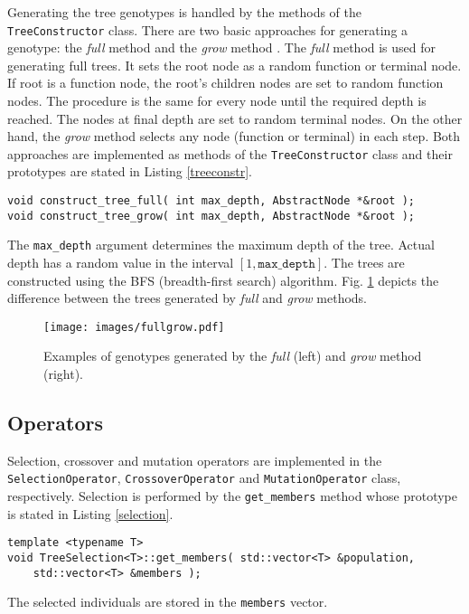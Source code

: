 Generating the tree genotypes is handled by the methods of the \texttt{TreeConstructor} class.
There are two basic approaches for generating a genotype: the \textit{full} method and the \textit{grow} method \cite{koza1992genetic}.
The \textit{full} method is used for generating full trees. 
It sets the root node as a random function or terminal node.
If root is a function node, the root's children nodes are set to random function nodes.
The procedure is the same for every node until the required depth is reached.
The nodes at final depth are set to random terminal nodes.
On the other hand, the \textit{grow} method selects any node (function or terminal) in each step.
Both approaches are implemented as methods of the \texttt{TreeConstructor} class and their prototypes are stated in Listing \ref{treeconstr}.
\begin{lstlisting}[frame=none, label={treeconstr}, caption={Functions for implementing the \textit{full} and \textit{grow} methods for creating a genotype.}, captionpos=b]
void construct_tree_full( int max_depth, AbstractNode *&root );
void construct_tree_grow( int max_depth, AbstractNode *&root );
\end{lstlisting}
The \texttt{max\_depth} argument determines the maximum depth of the tree.
Actual depth has a random value in the interval $[1, \texttt{max\_depth}]$.
The trees are constructed using the BFS (breadth-first search) algorithm.
Fig. \ref{fullgrow} depicts the difference between the trees generated by \textit{full} and \textit{grow} methods.
\begin{figure}[ht]
    \centering
    \texttt{[image: images/fullgrow.pdf]}
    \caption{Examples of genotypes generated by the \textit{full} (left) and \textit{grow} method (right).}
    \label{fullgrow}
\end{figure}

\subsection{Operators}
Selection, crossover and mutation operators are implemented in the \\\texttt{SelectionOperator}, \texttt{CrossoverOperator} and \texttt{MutationOperator} class, respectively.
Selection is performed by the \texttt{get\_members} method whose prototype is stated in Listing \ref{selection}.
\begin{lstlisting}[frame=none, label={selection}, caption={Prototype of the \texttt{get\_members} method which performs selection.}, captionpos=b]
template <typename T>
void TreeSelection<T>::get_members( std::vector<T> &population, 
	std::vector<T> &members );
\end{lstlisting}
The selected individuals are stored in the \texttt{members} vector.


